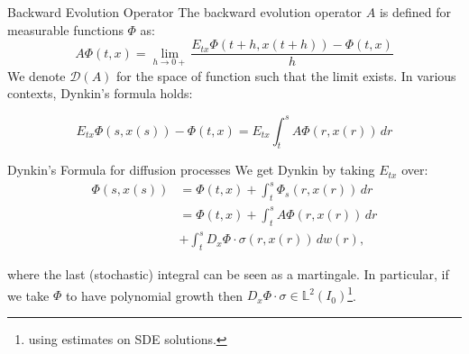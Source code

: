 \documentclass[10pt, compress]{beamer}
\begin{document}

\begin{frame}{Backward Evolution Operator}
    The backward evolution operator $A$ is defined for measurable functions $\Phi$ as:
    \begin{equation}A\Phi(t,x) = \lim_{h\to0+} \frac{E_{tx}\Phi(t+h,x(t+h))-\Phi(t,x)}{h}\end{equation}
    We denote $\mathcal{D}(A)$ for the space of function such that the limit exists. In various contexts, Dynkin's formula holds:

    \begin{equation}\label{2-1-dynkform}
            E_{tx}\Phi(s,x(s)) - \Phi(t,x) = E_{tx}\int_t^s A\Phi(r,x(r)) \,dr
        \end{equation}
\end{frame}

\begin{frame}{Dynkin's Formula for diffusion processes}
    We get Dynkin by taking $E_{tx}$ over:
    \begin{align}\label{dynk-deriv}
    \Phi(s,x(s)) & = \Phi(t,x) + \int_t^s\Phi_s(r,x(r))\,dr \\
    & = \Phi(t,x) + \int_t^s A\Phi(r,x(r))\,dr \\
    & +\int_t^s D_x\Phi\cdot\sigma(r,x(r)) \,dw(r),
\end{align}

where the last (stochastic) integral can be seen as a martingale. In particular, if we take $\Phi$ to have polynomial growth then $D_x\Phi\cdot\sigma\in\mathbb{L}^2(I_0)$\footnote{using estimates on SDE solutions.}.


\end{frame}
\end{document}
